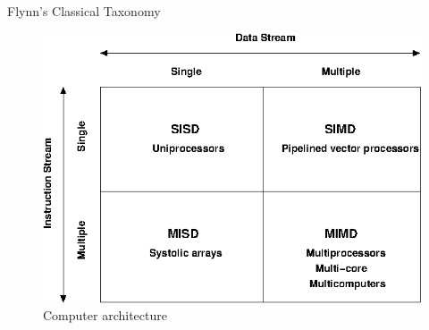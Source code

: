 \documentclass[10pt,times]{beamer}
\begin{document}
\begin{frame}{Flynn's Classical Taxonomy}

\begin{figure}
\includegraphics[width=0.7\linewidth]{figs/flynn}
\caption*{Computer architecture}
\end{figure}
\end{frame}
\end{document}
